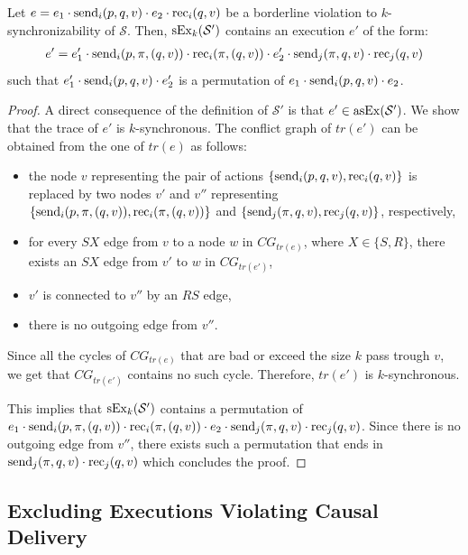 \begin{lemma}
Let $e=e_1\cdot \send{i}{p,q,v}\cdot e_2\cdot \rec{i}{q,v}$ be a borderline violation to $k$-synchronizability of $\mathcal{S}$. Then, $\synchExec{\mathcal{S'}}{k}$ contains an execution $e'$ of the form: 
\begin{align*}
e'=e_1'\cdot \send{i}{p,\pi,(q,v)}\cdot \rec{i}{\pi,(q,v)}\cdot e_2'\cdot \send{j}{\pi,q,v}\cdot \rec{j}{q,v}
\end{align*}
such that $e_1'\cdot \send{i}{p,q,v} \cdot e_2'$ is a permutation of $e_1\cdot \send{i}{p,q,v}\cdot e_2$.
\end{lemma}
\begin{proof}
A direct consequence of the definition of $\mathcal{S'}$ is that $e'\in\asynchExec{\mathcal{S'}}$. We show that the trace of $e'$ is $k$-synchronous. The conflict graph of $tr(e')$ can be obtained from the one of $tr(e)$ as follows:
\begin{itemize}
	\item the node $v$ representing the pair of actions $\{\send{i}{p,q,v},\rec{i}{q,v}\}$ is replaced by two nodes $v'$ and $v''$ representing $\{\send{i}{p,\pi,(q,v)}, \rec{i}{\pi,(q,v)}\}$ and $\{\send{j}{\pi,q,v}, \rec{j}{q,v}\}$, respectively,
	\item for every $SX$ edge from $v$ to a node $w$ in $CG_{tr(e)}$, where $X\in\{S,R\}$, there exists an $SX$ edge from $v'$ to $w$ in $CG_{tr(e')}$,
	\item $v'$ is connected to $v''$ by an $RS$ edge,
	\item there is no outgoing edge from $v''$.
\end{itemize}
Since all the cycles of $CG_{tr(e)}$ that are bad or exceed the size $k$ pass trough $v$, we get that $CG_{tr(e')}$ contains no such cycle.
Therefore, $tr(e')$ is $k$-synchronous. 

This implies that $\synchExec{\mathcal{S'}}{k}$ contains a permutation of $e_1\cdot \send{i}{p,\pi,(q,v)}\cdot \rec{i}{\pi,(q,v)}\cdot e_2\cdot \send{j}{\pi,q,v}\cdot \rec{j}{q,v}$. Since there is no outgoing edge from $v''$, there exists such a permutation that ends in $\send{j}{\pi,q,v}\cdot \rec{j}{q,v}$ which concludes the proof.
\end{proof}

\subsection{Excluding Executions Violating Causal Delivery}\label{asec:causal-delivery}

